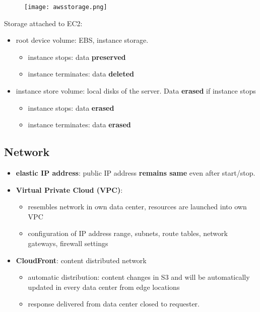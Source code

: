 \begin{figure}[H]
	\centering
	\texttt{[image: awsstorage.png]}
\end{figure}

Storage attached to EC2:
\begin{itemize}
	\item root device volume: EBS, instance storage. 
	\begin{itemize}
		\item instance stops: data \textbf{preserved}
		\item instance terminates: data \textbf{deleted}
	\end{itemize}
	\item instance store volume: local disks of the server. Data \textbf{erased} if instance stops
	\begin{itemize}
		\item instance stops: data \textbf{erased}
		\item instance terminates: data \textbf{erased}
	\end{itemize}
\end{itemize}

\subsection{Network}
\begin{itemize}
	\item \textbf{elastic IP address}: public IP address \textbf{remains same} even after start/stop.
	\item \textbf{Virtual Private Cloud (VPC)}: 
	\begin{itemize}
		\item resembles network in own data center, resources are launched into own VPC
		\item configuration of IP address range, subnets, route tables, network gateways, firewall settings	
	\end{itemize}
	\item \textbf{CloudFront}: content distributed network
	\begin{itemize}
		\item automatic distribution: content changes in S3 and will be automatically updated in every data center from edge locations
		\item response delivered from data center closed to requester.
	\end{itemize}
\end{itemize}


